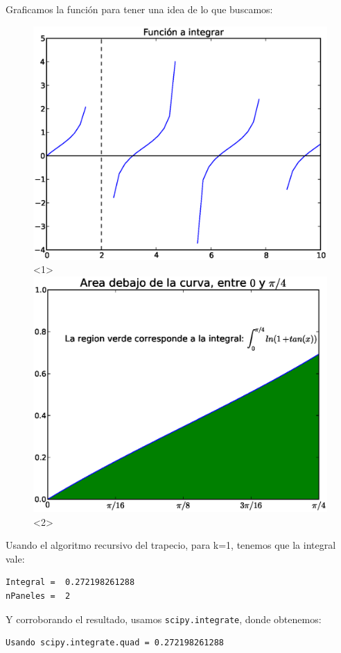 \documentclass[12pt]{beamer}
\begin{document}
\begin{frame}[fragile]
Graficamos la funci\'{o}n para tener una idea de lo que buscamos:
\begin{figure}
	\centering
	\includegraphics[scale=0.5]{Problema1_01.eps}<1>
	\includegraphics[scale=0.5]{Problema1_02.eps}<2>
\end{figure}
\end{frame}
\begin{frame}[fragile]
Usando el algoritmo recursivo del trapecio, para k=1, tenemos que la integral vale:
\begin{verbatim}
Integral =  0.272198261288 
nPaneles =  2
\end{verbatim}
Y corroborando el resultado, usamos \texttt{scipy.integrate}, donde obtenemos:
\begin{verbatim}
Usando scipy.integrate.quad = 0.272198261288
\end{verbatim}
\end{frame}
\end{document}
